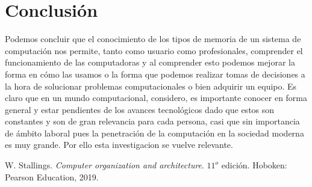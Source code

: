 \documentclass[conference]{IEEEtran}
\begin{document}
\section{Conclusi\'on}
Podemos concluir que el conocimiento de los tipos de memoria de un sistema de computaci\'on nos
permite, tanto como usuario como profesionales, comprender el funcionamiento de las computadoras
y al comprender esto podemos mejorar la forma en c\'omo las usamos o la forma que podemos realizar
tomas de decisiones a la hora de solucionar problemas computacionales o bien adquirir un equipo.
Es claro que en un mundo computacional, considero, es importante conocer en forma general y estar
pendientes de los avances tecnol\'ogicos dado que estos son constantes y son de gran relevancia
para cada persona, casi que sin importancia de \'ambito laboral pues la penetraci\'on de la
computaci\'on en la sociedad moderna es muy grande. Por ello esta investigacion se vuelve relevante.

\begin{thebibliography}{00}
 W. Stallings. \textit{Computer organization and architecture}. $11^{o}$ edici\'on. Hoboken: Pearson Education, 2019.

\end{thebibliography}
\end{document}
